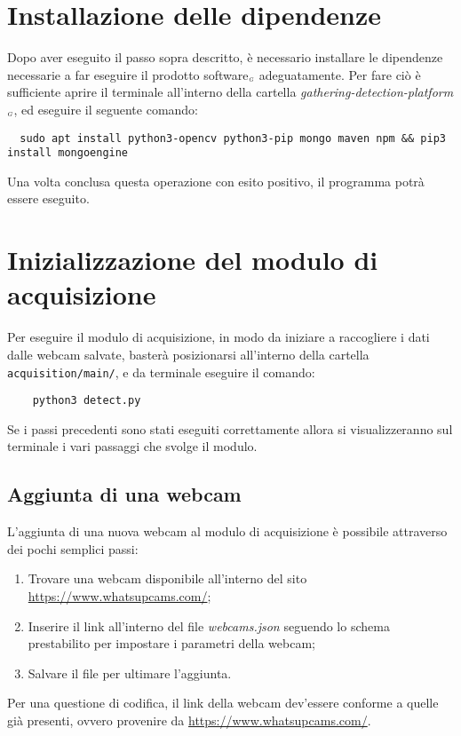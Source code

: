 \section{Installazione delle dipendenze}\label{ProceduraDiInstallazioneInstallazioneDipendenze}
Dopo aver eseguito il passo sopra descritto, è necessario installare le dipendenze necessarie a far eseguire il prodotto software$_{\scaleto{G}{3pt}}$ adeguatamente.
Per fare ciò è sufficiente aprire il terminale all'interno della cartella \textit{gathering-detection-platform$_{\scaleto{G}{3pt}}$}, ed eseguire il seguente comando:
\begin{lstlisting}
  sudo apt install python3-opencv python3-pip mongo maven npm && pip3 install mongoengine
\end{lstlisting}

Una volta conclusa questa operazione con esito positivo, il programma potrà essere eseguito.

\section{Inizializzazione del modulo di acquisizione}\label{ProceduraDiInstallazioneInizializzazioneModuloAcquisition}
Per eseguire il modulo di acquisizione, in modo da iniziare a raccogliere i dati dalle webcam salvate, basterà posizionarsi all'interno della cartella \texttt{acquisition/main/}, e da terminale eseguire il comando:
\begin{lstlisting}
    python3 detect.py
\end{lstlisting}
Se i passi precedenti sono stati eseguiti correttamente allora si visualizzeranno sul terminale i vari passaggi che svolge il modulo.

\subsection{Aggiunta di una webcam}
L'aggiunta di una nuova webcam al modulo di acquisizione è possibile attraverso dei pochi semplici passi:
\begin{enumerate}
	\item Trovare una webcam disponibile all'interno del sito \url{https://www.whatsupcams.com/};
	\item Inserire il link all'interno del file \textit{webcams.json} seguendo lo schema prestabilito per impostare i parametri della webcam;
	\item Salvare il file per ultimare l'aggiunta.
\end{enumerate}
Per una questione di codifica, il link della webcam dev'essere conforme a quelle già presenti, ovvero provenire da \url{https://www.whatsupcams.com/}.


